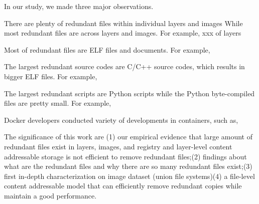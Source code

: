 In our study, we made three major observations.
%
\begin{compactitemize}
%
\item There are plenty of redundant files within individual layers and images
While most redundant files are across layers and images.
%
For example, xxx of layers
%
\item Most of redundant files are ELF files and documents.
%
For example,
%
\item The largest redundant source codes are C/C++ source codes, which results
in bigger ELF files.
%
For example,
%
\item The largest redundant scripts are Python scripts while the Python
byte-compiled files are pretty small.
%
For example,
%
\item Docker developers conducted variety of developments in containers, such
as,
%
\end{compactitemize}

The significance of this work are (1) our empirical evidence that large amount
of redundant files exist in layers, images, and registry and layer-level
content addressable storage is not efficient to remove redundant files;(2)
findings about what are the redundant files and why there are so many redundant
files exist;(3) first in-depth characterization on image dataset (union file
systems)(4) a file-level content addressable model that can efficiently remove
redundant copies while maintain a good performance.


